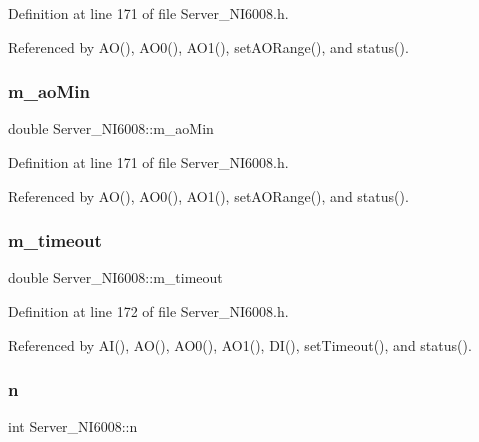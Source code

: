 Definition at line 171 of file Server\+\_\+\+N\+I6008.\+h.



Referenced by A\+O(), A\+O0(), A\+O1(), set\+A\+O\+Range(), and status().

\mbox{\label{classServer__NI6008_ad650503ceebacea17688e04065130eaa}} 
\subsubsection{\texorpdfstring{m\+\_\+ao\+Min}{m\_aoMin}}
{\footnotesize\ttfamily double Server\+\_\+\+N\+I6008\+::m\+\_\+ao\+Min\hspace{0.3cm}{\ttfamily [private]}}



Definition at line 171 of file Server\+\_\+\+N\+I6008.\+h.



Referenced by A\+O(), A\+O0(), A\+O1(), set\+A\+O\+Range(), and status().

\mbox{\label{classServer__NI6008_a782b89c4483096900a3c02f1b1fc2c2f}} 
\subsubsection{\texorpdfstring{m\+\_\+timeout}{m\_timeout}}
{\footnotesize\ttfamily double Server\+\_\+\+N\+I6008\+::m\+\_\+timeout\hspace{0.3cm}{\ttfamily [private]}}



Definition at line 172 of file Server\+\_\+\+N\+I6008.\+h.



Referenced by A\+I(), A\+O(), A\+O0(), A\+O1(), D\+I(), set\+Timeout(), and status().

\mbox{\label{classServer__NI6008_a5573d5feeef8372e2b31a54d6a5a19aa}} 
\subsubsection{\texorpdfstring{n}{n}}
{\footnotesize\ttfamily int Server\+\_\+\+N\+I6008\+::n\hspace{0.3cm}{\ttfamily [private]}}



